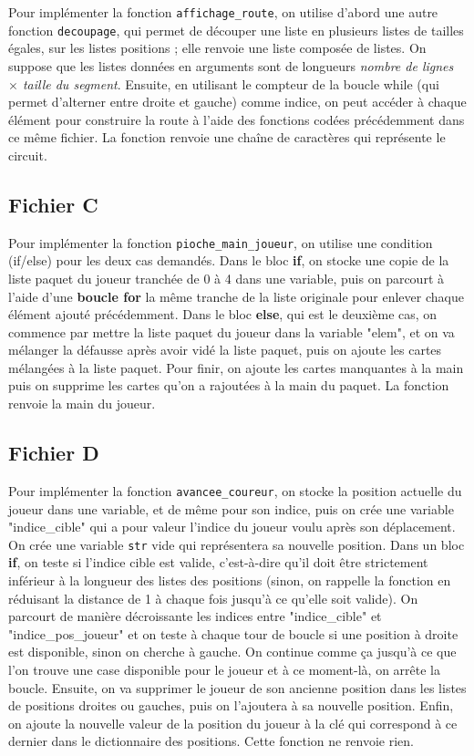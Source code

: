 \documentclass{article}
\begin{document}
Pour implémenter la fonction \texttt{affichage\_route}, on utilise d'abord une autre fonction \texttt{decoupage}, qui permet de découper une liste en plusieurs listes de tailles égales, sur les listes positions ; elle renvoie une liste composée de listes. On suppose que les listes données en arguments sont de longueurs \textit{nombre de lignes $\times$ taille du segment}. Ensuite, en utilisant le compteur de la boucle while (qui permet d'alterner entre droite et gauche) comme indice, on peut accéder à chaque élément pour construire la route à l'aide des fonctions codées précédemment dans ce même fichier. La fonction renvoie une chaîne de caractères qui représente le circuit.

\subsection{Fichier C}

Pour implémenter la fonction \texttt{pioche\_main\_joueur}, on utilise une condition (if/else) pour les deux cas demandés. Dans le bloc \textbf{if}, on stocke une copie de la liste paquet du joueur tranchée de 0 à 4 dans une variable, puis on parcourt à l'aide d'une \textbf{boucle for} la même tranche de la liste originale pour enlever chaque élément ajouté précédemment. Dans le bloc \textbf{else}, qui est le deuxième cas, on commence par mettre la liste paquet du joueur dans la variable "elem", et on va mélanger la défausse après avoir vidé la liste paquet, puis on ajoute les cartes mélangées à la liste paquet. Pour finir, on ajoute les cartes manquantes à la main puis on supprime les cartes qu'on a rajoutées à la main du paquet. La fonction renvoie la main du joueur.

\subsection{Fichier D}

Pour implémenter la fonction \texttt{avancee\_coureur}, on stocke la position actuelle du joueur dans une variable, et de même pour son indice, puis on crée une variable "indice\_cible" qui a pour valeur l'indice du joueur voulu après son déplacement. On crée une variable \texttt{str} vide qui représentera sa nouvelle position. Dans un bloc \textbf{if}, on teste si l'indice cible est valide, c'est-à-dire qu'il doit être strictement inférieur à la longueur des listes des positions (sinon, on rappelle la fonction en réduisant la distance de 1 à chaque fois jusqu'à ce qu'elle soit valide). On parcourt de manière décroissante les indices entre "indice\_cible" et "indice\_pos\_joueur" et on teste à chaque tour de boucle si une position à droite est disponible, sinon on cherche à gauche. On continue comme ça jusqu'à ce que l'on trouve une case disponible pour le joueur et à ce moment-là, on arrête la boucle. Ensuite, on va supprimer le joueur de son ancienne position dans les listes de positions droites ou gauches, puis on l'ajoutera à sa nouvelle position. Enfin, on ajoute la nouvelle valeur de la position du joueur à la clé qui correspond à ce dernier dans le dictionnaire des positions. Cette fonction ne renvoie rien.
\end{document}
